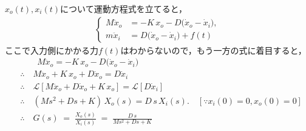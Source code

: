 \documentclass[a4paper,12pt]{article}
\begin{document}
\begin{tcolorbox}
        \({x}_o(t),{x}_i(t)\)について運動方程式を立てると，
    \begin{align*}
        \left\{
            \begin{aligned}
                M\ddot{x}_o &= -K\,x_o - D\bigl(\dot{x}_o-\dot{x}_i\bigr),\\
                m\ddot{x}_i &= D\bigl(\dot{x}_o-\dot{x}_i\bigr) + f(t)
            \end{aligned}
        \right.
    \end{align*}
        ここで入力側にかかる力\(f(t)\)はわからないので，もう一方の式に着目すると，
    \begin{align*}
        &\qquad M\ddot{x}_o = -K\,x_o - D\bigl(\dot{x}_o-\dot{x}_i\bigr) \\
        &\therefore \quad M\ddot{x}_o + K\,x_o + D \dot{x}_o=D \dot{x}_i \\
        &\therefore \quad \mathcal{L} \left[  M\ddot{x}_o + D \dot{x}_o + K\,x_o  \right] 
        =\mathcal{L} \left[ D \dot{x}_i \right] \\
        &\therefore \quad (M s^2 + D s + K)\,X_o(s) = D\,s\,X_i(s). \quad [\because x_i(0)= 0, x_o(0)=0 ]\\
        &\therefore \quad G(s) \;=\;\frac{X_o(s)}{X_i(s)}
        \;=\;\frac{D\,s}{M s^2 + D s + K}\\
    \end{align*}


\end{tcolorbox}
\end{document}
